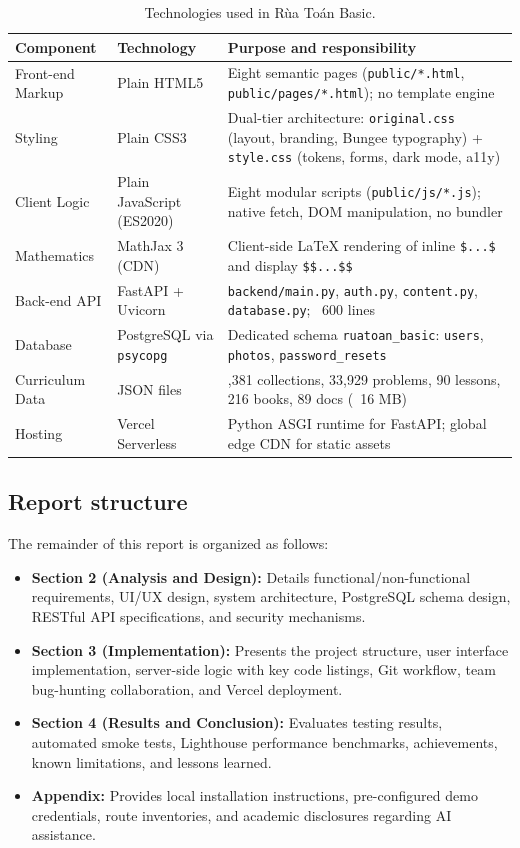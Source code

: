 \begin{table}[ht]
\centering\small
\begin{tabularx}{\textwidth}{@{}l l >{\raggedright\arraybackslash}X@{}}
\toprule
\textbf{Component} & \textbf{Technology} & \textbf{Purpose and responsibility}\\
\midrule
Front-end Markup & Plain HTML5 & Eight semantic pages (\texttt{public/*.html}, \texttt{public/pages/*.html}); no template engine\\
Styling & Plain CSS3 & Dual-tier architecture: \texttt{original.css} (layout, branding, Bungee typography) + \texttt{style.css} (tokens, forms, dark mode, a11y)\\
Client Logic & Plain JavaScript (ES2020) & Eight modular scripts (\texttt{public/js/*.js}); native fetch, DOM manipulation, no bundler\\
Mathematics & MathJax 3 (CDN) & Client-side LaTeX rendering of inline \texttt{\$...\$} and display \texttt{\$\$...\$\$}\\
Back-end API & FastAPI + Uvicorn & \texttt{backend/main.py}, \texttt{auth.py}, \texttt{content.py}, \texttt{database.py}; ~600 lines\\
Database & PostgreSQL via \texttt{psycopg} & Dedicated schema \texttt{ruatoan\_basic}: \texttt{users}, \texttt{photos}, \texttt{password\_resets}\\
Curriculum Data & JSON files & 3,381 collections, 33,929 problems, 90 lessons, 216 books, 89 docs (~16 MB)\\
Hosting & Vercel Serverless & Python ASGI runtime for FastAPI; global edge CDN for static assets\\
\bottomrule
\end{tabularx}
\caption{Technologies used in Rùa Toán Basic.}
\label{tab:technology}
\end{table}

\subsection{Report structure}
The remainder of this report is organized as follows:
\begin{itemize}
  \item \textbf{Section 2 (Analysis and Design):} Details functional/non-functional requirements, UI/UX design,
        system architecture, PostgreSQL schema design, RESTful API specifications, and security mechanisms.
  \item \textbf{Section 3 (Implementation):} Presents the project structure, user interface implementation,
        server-side logic with key code listings, Git workflow, team bug-hunting collaboration, and Vercel deployment.
  \item \textbf{Section 4 (Results and Conclusion):} Evaluates testing results, automated smoke tests, Lighthouse
        performance benchmarks, achievements, known limitations, and lessons learned.
  \item \textbf{Appendix:} Provides local installation instructions, pre-configured demo credentials, route inventories,
        and academic disclosures regarding AI assistance.
\end{itemize}
